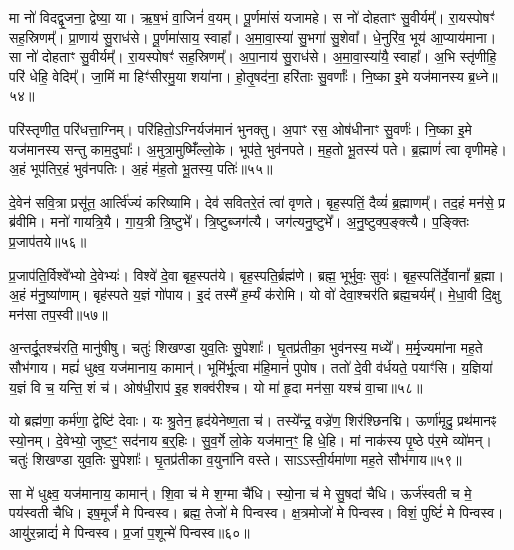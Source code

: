 मा नो॑ विदद्वृ॒जना॒ द्वेष्या॒ या।
ऋ॒ष॒भं वा॒जिनं॑ व॒यम्।
पू॒र्णमा॑सं यजामहे।
स नो॑ दोहताꣳ सु॒वीर्यम्᳚।
रा॒यस्पोषꣳ॑ सह॒स्रिणम्᳚।
प्रा॒णाय॑ सु॒राध॑से।
पू॒र्णमा॑साय॒ स्वाहा᳚।
अ॒मा॒वा॒स्या॑ सु॒भगा॑ सु॒शेवा᳚।
धे॒नुरि॑व॒ भूय॑ आ॒प्याय॑माना।
सा नो॑ दोहताꣳ सु॒वीर्यम्᳚।
रा॒यस्पोषꣳ॑ सह॒स्रिणम्᳚।
अ॒पा॒नाय॑ सु॒राध॑से।
अ॒मा॒वा॒स्या॑यै॒ स्वाहा᳚।
अ॒भि स्तृ॑णीहि॒ परि॑ धेहि॒ वेदिम्᳚।
जा॒मिं मा हिꣳ॑सीरमु॒या शया॑ना।
हो॒तृ॒षद॑ना॒ हरि॑ताः सु॒वर्णाः᳚।
नि॒ष्का इ॒मे यज॑मानस्य ब्र॒ध्ने॥५४॥\ip{}

परि॑स्तृणीत॒ परि॑धत्ता॒ग्निम्।
परि॑हितो॒\-ऽग्निर्यज॑मानं भुनक्तु।
अ॒पाꣳ रस॒ ओष॑धीनाꣳ सु॒वर्णः॑।
नि॒ष्का इ॒मे यज॑मानस्य सन्तु काम॒दुघाः᳚।
अ॒मुत्रा॒मुष्मिँ॑ल्लो॒के।
भूप॑ते॒ भुव॑नपते।
म॒ह॒तो भू॒तस्य॑ पते।
ब्र॒ह्माणं॑ त्वा वृणीमहे।
अ॒हं भूप॑तिर॒हं भुव॑नपतिः।
अ॒हं म॑ह॒तो भू॒तस्य॒ पतिः॑॥५५॥\ip

दे॒वेन॑ सवि॒त्रा प्रसू॑त॒ आर्त्वि॑ज्यं करिष्यामि।
देव॑ सवितरे॒तं त्वा॑ वृणते।
बृह॒स्पतिं॒ दैव्यं॑ ब्र॒ह्माणम्᳚।
तद॒हं मन॑से॒ प्र ब्र॑वीमि।
मनो॑ गायत्रि॒यै।
गा॒य॒त्री त्रि॒ष्टुभे᳚।
त्रि॒ष्टुब्जग॑त्यै।
जग॑त्यनु॒ष्टुभे᳚।
अ॒नु॒ष्टुक्प॒ङ्क्त्यै।
प॒ङ्क्तिः प्र॒जा\-प॑तये॥५६॥\ip

प्र॒जा\-प॑ति॒र्विश्वे᳚भ्यो दे॒वेभ्यः॑।
विश्वे॑ दे॒वा बृह॒स्पत॑ये।
बृह॒स्पति॒र्ब्रह्म॑णे।
ब्रह्म॒ भूर्भुवः॒ सुवः॑।
बृह॒स्पति॑र्दे॒वानां᳚ ब्र॒ह्मा।
अ॒हं म॑नु॒ष्या॑णाम्।
बृह॑स्पते य॒ज्ञं गो॑पाय।
इ॒दं तस्मै॑ ह॒र्म्यं क॑रोमि।
यो वो॑ देवा॒श्चर॑ति ब्रह्म॒चर्यम्᳚।
मे॒धा॒वी दि॒क्षु मन॑सा तप॒स्वी॥५७॥\ip

अ॒न्तर्दू॒तश्च॑रति॒ मानु॑षीषु।
चतुः॑ शिखण्डा युव॒तिः सु॒पेशाः᳚।
घृ॒तप्र॑तीका॒ भुव॑नस्य॒ मध्ये᳚।
म॒र्मृ॒ज्यमा॑ना मह॒ते सौभ॑गाय।
मह्यं॑ धुक्ष्व॒ यज॑मानाय॒ कामान्॑।
भूमि॑र्भू॒त्वा म॑हि॒मानं॑ पुपोष।
ततो॑ दे॒वी व॑र्धयते॒ पयाꣳ॑सि।
य॒ज्ञिया॑ य॒ज्ञं वि च॒ यन्ति॒ शं च॑।
ओष॑धी॒राप॑ इ॒ह शक्व॑रीश्च।
यो मा॑ हृ॒दा मन॑सा॒ यश्च॑ वा॒चा॥५८॥\ip

यो ब्रह्म॑णा॒ कर्म॑णा॒ द्वेष्टि॑ देवाः।
यः श्रु॒तेन॒ हृद॑येनेष्ण॒ता च॑।
तस्ये᳚न्द्र॒ वज्रे॑ण॒ शिर॑श्छिनद्मि।
ऊर्णा॑मृदु॒ प्रथ॑मानꣴ स्यो॒नम्।
दे॒वेभ्यो॒ जुष्ट॒ꣳ॒ सद॑नाय ब॒र्॒हिः।
सु॒व॒र्गे लो॒के यज॑मान॒ꣳ॒ हि धे॒हि।
मां नाक॑स्य पृ॒ष्ठे प॑र॒मे व्यो॑मन्।
चतुः॑ शिखण्डा युव॒तिः सु॒पेशाः᳚।
घृ॒तप्र॑तीका व॒युना॑नि वस्ते।
साऽऽस्ती॒र्यमा॑णा मह॒ते सौभ॑गाय॥५९॥\ip

सा मे॑ धुक्ष्व॒ यज॑मानाय॒ कामान्॑।
शि॒वा च॑ मे श॒ग्मा चै॑धि।
स्यो॒ना च॑ मे सु॒षदा॑ चैधि।
ऊर्ज॑स्वती च मे॒ पय॑स्वती चैधि।
इष॒मूर्जं॑ मे पिन्वस्व।
ब्रह्म॒ तेजो॑ मे पिन्वस्व।
क्ष॒त्रमोजो॑ मे पिन्वस्व।
विशं॒ पुष्टिं॑ मे पिन्वस्व।
आयु॑र॒न्नाद्यं॑ मे पिन्वस्व।
प्र॒जां प॒शून्मे॑ पिन्वस्व॥६०॥\ip

